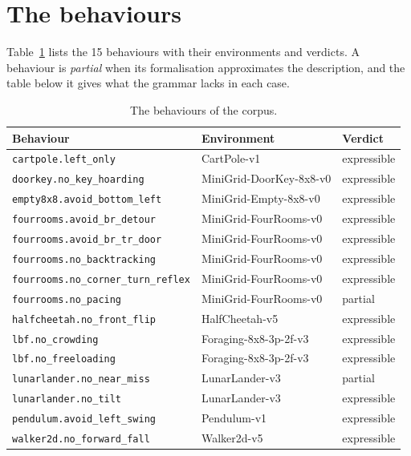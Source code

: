 \section{The behaviours}
\label{app:corpus}

Table~\ref{tab:corpus} lists the 15 behaviours with their environments and verdicts. A behaviour is \emph{partial} when its formalisation approximates the description, and the table below it gives what the grammar lacks in each case.

\begin{table}[h]\centering\footnotesize
\caption{The behaviours of the corpus.}
\label{tab:corpus}
\setlength{\tabcolsep}{4pt}
\begin{tabular}{@{}lll@{}}\toprule
Behaviour & Environment & Verdict \\ \midrule
\texttt{cartpole.left\_only} & CartPole-v1 & expressible \\
\texttt{doorkey.no\_key\_hoarding} & MiniGrid-DoorKey-8x8-v0 & expressible \\
\texttt{empty8x8.avoid\_bottom\_left} & MiniGrid-Empty-8x8-v0 & expressible \\
\texttt{fourrooms.avoid\_br\_detour} & MiniGrid-FourRooms-v0 & expressible \\
\texttt{fourrooms.avoid\_br\_tr\_door} & MiniGrid-FourRooms-v0 & expressible \\
\texttt{fourrooms.no\_backtracking} & MiniGrid-FourRooms-v0 & expressible \\
\texttt{fourrooms.no\_corner\_turn\_reflex} & MiniGrid-FourRooms-v0 & expressible \\
\texttt{fourrooms.no\_pacing} & MiniGrid-FourRooms-v0 & partial \\
\texttt{halfcheetah.no\_front\_flip} & HalfCheetah-v5 & expressible \\
\texttt{lbf.no\_crowding} & Foraging-8x8-3p-2f-v3 & expressible \\
\texttt{lbf.no\_freeloading} & Foraging-8x8-3p-2f-v3 & expressible \\
\texttt{lunarlander.no\_near\_miss} & LunarLander-v3 & partial \\
\texttt{lunarlander.no\_tilt} & LunarLander-v3 & expressible \\
\texttt{pendulum.avoid\_left\_swing} & Pendulum-v1 & expressible \\
\texttt{walker2d.no\_forward\_fall} & Walker2d-v5 & expressible \\
\bottomrule\end{tabular}\end{table}

